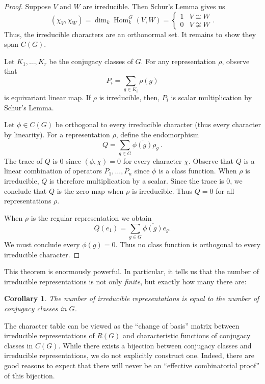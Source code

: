 \documentclass[12pt]{article}
\theoremstyle{plain}
\newtheorem{corollary}[theorem]{Corollary}
\theoremstyle{definition}
\theoremstyle{remark}
\numberwithin{equation}{section}
\begin{document}
\begin{proof}
Suppose $V$ and $W$ are irreducible.
Then Schur's Lemma gives us
\[
\left( \chi_V, \chi_W \right)
= \dim_k \operatorname{Hom}^G_k(V,W) =
\begin{cases}
1 & V \cong W\\
0 & V \not\cong W
\end{cases}.
\]
Thus, the irreducible characters are an orthonormal set.
It remains to show they span $C(G)$.

Let $K_1,\ldots,K_r$ be the conjugacy classes of $G$.
For any representation $\rho$, observe that
\[
P_i = \sum_{g \in K_i} \rho(g)
\]
is equivariant linear map.
If $\rho$ is irreducible, then, $P_i$ is scalar multiplication
by Schur's Lemma.

Let $\phi \in C(G)$ be orthogonal to every irreducible character
(thus every character by linearity).
For a representation $\rho$, define the endomorphism
\[
Q = \sum_{g \in G} \overline{\phi(g)} \rho_g \ .
\]
The trace of $Q$ is $0$ since $(\phi,\chi)=0$ for every character $\chi$.
Observe that $Q$ is a linear combination of operators $P_1,\ldots,P_n$
since $\phi$ is a class function.
When $\rho$ is irreducible, $Q$ is therefore multiplication by a scalar.
Since the trace is $0$, we conclude that $Q$ is the zero map
when $\rho$ is irreducible.  Thus $Q=0$ for all representations $\rho$.

When $\rho$ is the regular representation we obtain
\[
Q(e_1)=\sum_{g \in G} \overline{\phi(g)} e_g .
\]
We must conclude every $\phi(g)=0$.  Thus no class function is
orthogonal to every irreducible character.
\end{proof}

This theorem is enormously powerful.  In particular, it tells us that
the number of irreducible representations is not only \emph{finite}, but
exactly how many there are:

\begin{corollary}
The number of irreducible representations is equal to the number of
conjugacy classes in $G$.
\end{corollary}

The character table can be viewed as the ``change of basis'' matrix
between irreducible representations of $R(G)$ and characteristic
functions of conjugacy classes in $C(G)$.
While there exists a bijection between conjugacy classes
and irreducible representations, we do not explicitly construct one.
Indeed, there are good reasons to expect that there will never be an
``effective combinatorial proof'' of this bijection. 
\end{document}
